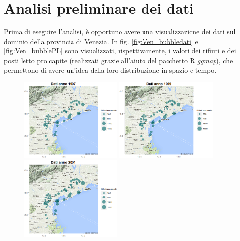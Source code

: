 \documentclass[a4paper,11pt,twoside,openright]{book}							%
\begin{document}
\section{Analisi preliminare dei dati}
Prima di eseguire l'analisi, è opportuno avere una visualizzazione dei dati sul dominio della provincia di Venezia. In fig. \ref{fig:Ven_bubbledati} e \ref{fig:Ven_bubblePL} sono visualizzati, rispettivamente, i valori dei rifiuti e dei posti letto pro capite (realizzati grazie all'aiuto del pacchetto R \textit{ggmap}), che permettono di avere un'idea della loro distribuzione in spazio e tempo.
\newpage
\begin{figure}[H]
	\centering
	\includegraphics[trim=0cm 0cm 0cm 0cm,clip=true,width=0.45\textwidth]{Immagini/venezia_dati/Dati1997.png}
	\includegraphics[trim=0cm 0cm 0cm 0cm,clip=true,width=0.45\textwidth]{Immagini/venezia_dati/Dati1999.png}
	\includegraphics[trim=0cm 0cm 0cm 0cm,clip=true,width=0.45\textwidth]{Immagini/venezia_dati/Dati2001.png}

\end{figure}
\end{document}
